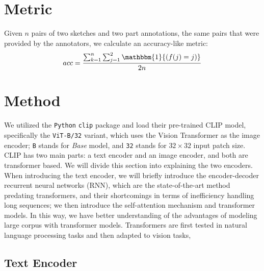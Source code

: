 \section{Metric}

Given $n$ pairs of two sketches and two part annotations, the same pairs that were provided by the annotators, we calculate an accuracy-like metric:
$$ acc = \frac{\sum_{k=1}^{n} \sum_{j=1}^2 \mathbbm{1}{(f(j) = j)}}{2n} $$

\section{Method}

We utilized the \texttt{Python} \texttt{clip} package and load their pre-trained CLIP model, specifically the \texttt{ViT-B/32} variant, which uses the Vision Transformer \citep{visiontransformer} as the image encoder; \texttt{B} stands for \textit{Base} model, and \texttt{32} stands for $32 \times 32$ input patch size. CLIP has two main parts: a text encoder and an image encoder, and both are transformer based. We will divide this section into explaining the two encoders. When introducing the text encoder, we will briefly introduce the encoder-decoder recurrent neural networks (RNN), which are the state-of-the-art method predating transformers, and their shortcomings in terms of inefficiency handling long sequences; we then introduce the self-attention mechanism and transformer models. In this way, we have better understanding of the advantages of modeling large corpus with transformer models. 
Transformers are first tested in natural language processing tasks and then adapted to vision tasks,

\subsection{Text Encoder}

